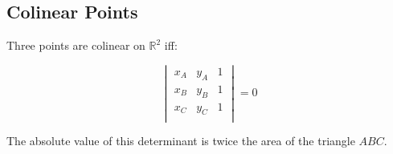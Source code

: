 \subsection{Colinear Points}

Three points are colinear on $\mathbb{R}^2$ iff:

$$ \begin{vmatrix}
x_A & y_A & 1 \\
x_B & y_B & 1 \\
x_C & y_C & 1 \\
\end{vmatrix}  = 0 $$

The absolute value of this determinant is twice the area of the triangle $ABC$.

